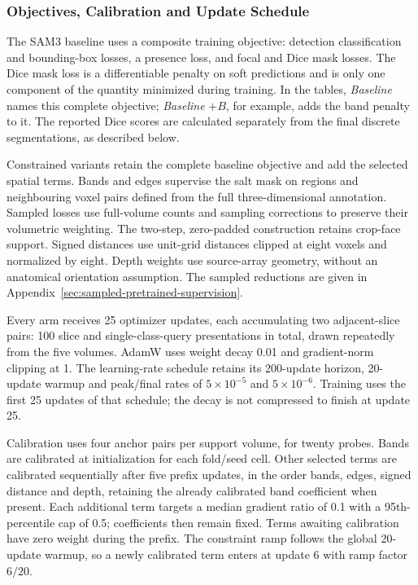 \documentclass[12pt,a4paper]{article}
\begin{document}
\subsubsection{Objectives, Calibration and Update Schedule}

The SAM3 baseline uses a composite training objective: detection
classification and bounding-box losses, a presence loss, and focal and
Dice mask losses. The Dice mask loss is a differentiable penalty on soft
predictions and is only one component of the quantity minimized during
training. In the tables, \emph{Baseline} names this complete objective;
\emph{Baseline} $+B$, for example, adds the band penalty to it. The
reported Dice scores are calculated separately from the final discrete
segmentations, as described below.

Constrained variants retain the complete baseline objective and add the
selected spatial terms. Bands and edges supervise the salt
mask on regions and neighbouring voxel pairs defined from the full
three-dimensional annotation. Sampled losses use full-volume counts
and sampling corrections to preserve their volumetric weighting. The two-step,
zero-padded construction retains crop-face support. Signed distances
use unit-grid distances clipped at eight voxels and normalized by eight.
Depth weights use source-array geometry, without an anatomical
orientation assumption. The sampled reductions are given in
Appendix~\ref{sec:sampled-pretrained-supervision}.

Every arm receives 25 optimizer updates, each accumulating two
adjacent-slice pairs: 100 slice and single-class-query presentations in
total, drawn repeatedly from the five volumes. AdamW uses weight decay
0.01 and gradient-norm clipping at 1. The learning-rate schedule retains
its 200-update horizon, 20-update warmup and peak/final rates of
$5\times10^{-5}$ and $5\times10^{-6}$. Training uses the first 25 updates
of that schedule; the decay is not compressed to finish at update 25.

Calibration uses four anchor pairs per support volume, for twenty
probes. Bands are calibrated at initialization for each fold/seed cell.
Other selected terms are calibrated sequentially after five prefix
updates, in the order bands, edges, signed distance and depth, retaining
the already calibrated band coefficient when present. Each additional
term targets a median gradient ratio of 0.1 with a 95th-percentile cap
of 0.5; coefficients then remain fixed. Terms awaiting calibration have
zero weight during the prefix. The constraint ramp follows the global
20-update warmup, so a newly calibrated term enters at update 6 with
ramp factor $6/20$.
\end{document}

